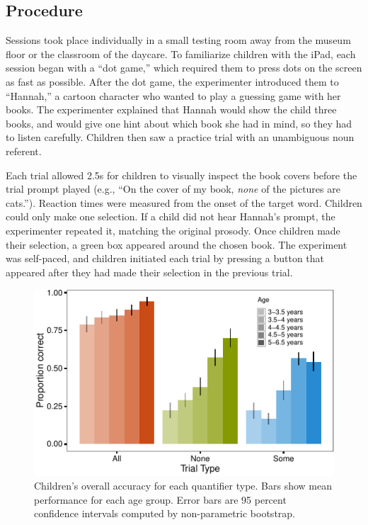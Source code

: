 \documentclass[10pt, letterpaper]{article}
\newenvironment{CodeChunk}{}{}
\begin{document}
\subsection{Procedure}\label{procedure}

Sessions took place individually in a small testing room away from the
museum floor or the classroom of the daycare. To familiarize children
with the iPad, each session began with a ``dot game,'' which required
them to press dots on the screen as fast as possible. After the dot
game, the experimenter introduced them to ``Hannah,'' a cartoon
character who wanted to play a guessing game with her books. The
experimenter explained that Hannah would show the child three books, and
would give one hint about which book she had in mind, so they had to
listen carefully. Children then saw a practice trial with an unambiguous
noun referent.

Each trial allowed 2.5s for children to visually inspect the book covers
before the trial prompt played (e.g., ``On the cover of my book,
\emph{none} of the pictures are cats.''). Reaction times were measured
from the onset of the target word. Children could only make one
selection. If a child did not hear Hannah's prompt, the experimenter
repeated it, matching the original prosody. Once children made their
selection, a green box appeared around the chosen book. The experiment
was self-paced, and children initiated each trial by pressing a button
that appeared after they had made their selection in the previous trial.

\begin{CodeChunk}
\begin{figure}[t]
\includegraphics{figs/overall_acc-1} \caption[Children's overall accuracy for each quantifier type]{Children's overall accuracy for each quantifier type. Bars show mean performance for each age group. Error bars are 95 percent confidence intervals computed by non-parametric bootstrap.}\label{fig:overall_acc}
\end{figure}
\end{CodeChunk}
\end{document}
